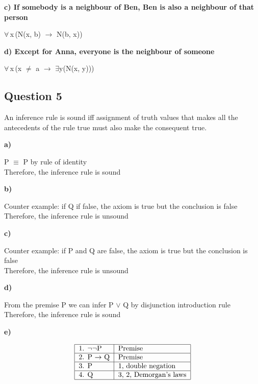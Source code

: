 \documentclass[11pt]{article}
\begin{document}
{\noindent
\textbf{c) If somebody is a neighbour of Ben, Ben is also a neighbour of that person}
\par\parindent 20pt
$\forall$\,x\,(N(x, b) $\rightarrow$ N(b, x))

\noindent
\textbf{d) Except for Anna, everyone is the neighbour of someone}
\par\parindent 20pt
$\forall$\,x\,(x $\neq$ a $\rightarrow$ $\exists$y(N(x, y)))

\subsection*{Question 5}
An inference rule is sound iff assignment of truth values that
makes all the antecedents of the rule true must also make the
consequent true.

\noindent
\textbf{a)} 

P $\equiv$ P by rule of identity\\
\indent
Therefore, the inference rule is sound
\parskip 6mm

\noindent
\textbf{b)} 

Counter example: if Q if false, the axiom is true but the conclusion is false\\
\indent
Therefore, the inference rule is unsound

\noindent
\textbf{c)} 

Counter example: if P and Q are false, the axiom is true but the conclusion is false\\
\indent
Therefore, the inference rule is unsound

\noindent
\textbf{d)} 

From the premise P we can infer P $\lor$ Q by disjunction introduction rule\\
\indent
Therefore, the inference rule is sound

\noindent
\textbf{e)} 

\setlength{\tabcolsep}{1em} %
{\renewcommand{\arraystretch}{1.5}%
\begin{displaymath}
    \begin{tabular}{| l | l |}
        \hline
        1. $\neg$$\neg$P & Premise \\
        \hline
        2. P $\rightarrow$ Q & Premise \\
        \hline
        3. P & 1, double negation \\
        \hline
        4. Q & 3, 2, Demorgan's laws\\
        \hline
    \end{tabular}
\end{displaymath}

}}
\end{document}
